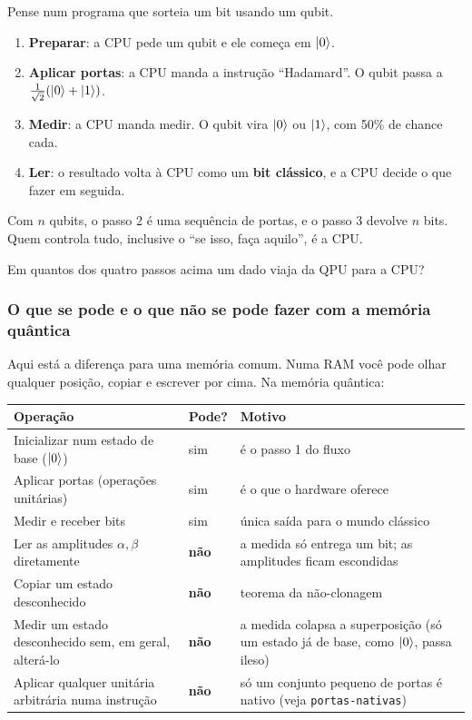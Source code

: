 Pense num programa que sorteia um bit usando um qubit.

\begin{enumerate}
\def\labelenumi{\arabic{enumi}.}
\tightlist
\item
  \textbf{Preparar}: a CPU pede um qubit e ele começa em \(\left|{0}\right>\).
\item
  \textbf{Aplicar portas}: a CPU manda a instrução ``Hadamard''. O qubit passa a \(\tfrac{1}{\sqrt2}(\left|{0}\right>+\left|{1}\right>)\).
\item
  \textbf{Medir}: a CPU manda medir. O qubit vira \(\left|{0}\right>\) ou \(\left|{1}\right>\), com 50\% de chance cada.
\item
  \textbf{Ler}: o resultado volta à CPU como um \textbf{bit clássico}, e a CPU decide o que fazer em seguida.
\end{enumerate}

Com \(n\) qubits, o passo 2 é uma sequência de portas, e o passo 3 devolve \(n\) bits. Quem controla tudo, inclusive o ``se isso, faça aquilo'', é a CPU.

Em quantos dos quatro passos acima um dado viaja da QPU para a CPU?

\subsubsection{O que se pode e o que não se pode fazer com a memória quântica}\label{o-que-se-pode-e-o-que-nuxe3o-se-pode-fazer-com-a-memuxf3ria-quuxe2ntica}

Aqui está a diferença para uma memória comum. Numa RAM você pode olhar qualquer posição, copiar e escrever por cima. Na memória quântica:

\begin{center}\begin{tabular}{lll}
\hline

Operação
 & 
Pode?
 & 
Motivo
 \\
\hline

\hline

Inicializar num estado de base (\(\left|{0}\right>\)) & sim & é o passo 1 do fluxo \\
Aplicar portas (operações unitárias) & sim & é o que o hardware oferece \\
Medir e receber bits & sim & única saída para o mundo clássico \\
Ler as amplitudes \(\alpha,\beta\) diretamente & \textbf{não} & a medida só entrega um bit; as amplitudes ficam escondidas \\
Copiar um estado desconhecido & \textbf{não} & teorema da não-clonagem \\
Medir um estado desconhecido sem, em geral, alterá-lo & \textbf{não} & a medida colapsa a superposição (só um estado já de base, como \(\left|{0}\right>\), passa ileso) \\
Aplicar qualquer unitária arbitrária numa instrução & \textbf{não} & só um conjunto pequeno de portas é nativo (veja \texttt{portas-nativas}) \\
\end{tabular}\end{center}

